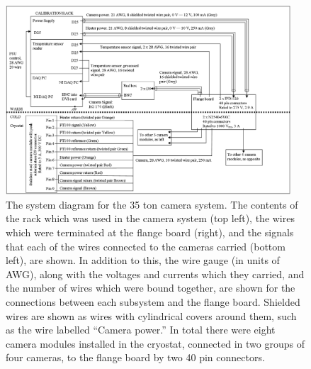 \begin{figure}[h!]
  \centering
  \includegraphics[width=0.95\textwidth]{Camera_Block_diagram}
  \caption[The system diagram for the 35 ton camera system]
          {The system diagram for the 35 ton camera system. The contents of the rack which was used in the camera system (top left), the wires which were terminated at the flange board (right), and the signals that each of the wires connected to the cameras carried (bottom left), are shown. In addition to this, the wire gauge (in units of AWG), along with the voltages and currents which they carried, and the number of wires which were bound together, are shown for the connections between each subsystem and the flange board. Shielded wires are shown as wires with cylindrical covers around them, such as the wire labelled ``Camera power.'' In total there were eight camera modules installed in the cryostat, connected in two groups of four cameras, to the flange board by two 40 pin connectors.}
  \label{fig:CamSysDiagram}
\end{figure}

